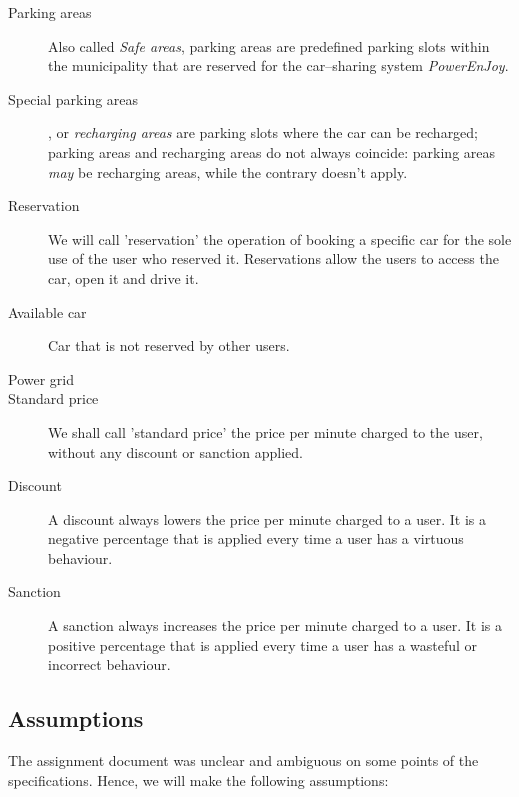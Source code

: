 \documentclass{article}
\begin{document}
\begin{description}
				
				\item[Parking areas] Also called \textit{Safe areas}, parking areas are predefined parking slots within the municipality that are reserved for the car–sharing system \textit{PowerEnJoy}.
				\item[Special parking areas], or \textit{recharging areas} are parking slots where the car can be recharged; parking areas and recharging areas do not always coincide: parking areas \textit{may} be recharging areas, while the contrary doesn't apply. %
				
				
				\item[Reservation] We will call 'reservation' the operation of booking a specific car for the sole use of the user who reserved it. Reservations allow the users to access the car, open it and drive it. %
				
				\item [Available car] Car that is not reserved by other users.
				
				\item[Power grid] %
				
				\item[Standard price] We shall call 'standard price' the price per minute charged to the user, without any discount or sanction applied. 
				
				\item[Discount] A discount always lowers the price per minute charged to a user. It is a negative percentage that is applied every time a user has a virtuous behaviour. 
				\item[Sanction] A sanction always increases the price per minute charged to a user. It is a positive percentage that is applied every time a user has a wasteful or incorrect behaviour. 
				
			\end{description}

		\subsection{Assumptions}
			The assignment document was unclear and ambiguous on some points of the specifications. Hence, we will make the following assumptions:
			
\end{document}
